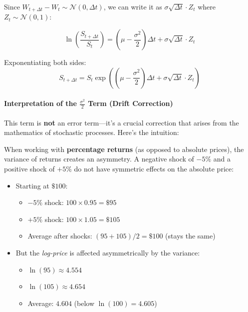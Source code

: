 \documentclass[12pt,a4paper]{article}
\begin{document}
Since $W_{t+\Delta t} - W_t \sim \mathcal{N}(0, \Delta t)$, we can write it as $\sigma \sqrt{\Delta t} \cdot Z_t$ where $Z_t \sim \mathcal{N}(0,1)$:

\begin{equation}
\ln\left(\frac{S_{t+\Delta t}}{S_t}\right) = \left(\mu - \frac{\sigma^2}{2}\right) \Delta t + \sigma \sqrt{\Delta t} \cdot Z_t
\end{equation}

Exponentiating both sides:
\begin{equation}
S_{t+\Delta t} = S_t \exp\left(\left(\mu - \frac{\sigma^2}{2}\right) \Delta t + \sigma \sqrt{\Delta t} \cdot Z_t\right)
\end{equation}

\paragraph{Interpretation of the $\frac{\sigma^2}{2}$ Term (Drift Correction)}

This term is \textbf{not} an error term—it's a crucial correction that arises from the mathematics of stochastic processes. Here's the intuition:

When working with \textbf{percentage returns} (as opposed to absolute prices), the variance of returns creates an asymmetry. A negative shock of $-5\%$ and a positive shock of $+5\%$ do not have symmetric effects on the absolute price:
\begin{itemize}
    \item Starting at $\$100$: 
        \begin{itemize}
            \item $-5\%$ shock: $100 \times 0.95 = \$95$
            \item $+5\%$ shock: $100 \times 1.05 = \$105$
            \item Average after shocks: $(95 + 105)/2 = \$100$ (stays the same)
        \end{itemize}
    \item But the \textit{log-price} is affected asymmetrically by the variance:
        \begin{itemize}
            \item $\ln(95) \approx 4.554$
            \item $\ln(105) \approx 4.654$
            \item Average: $4.604$ (below $\ln(100) = 4.605$)
        \end{itemize}
\end{itemize}
\end{document}
